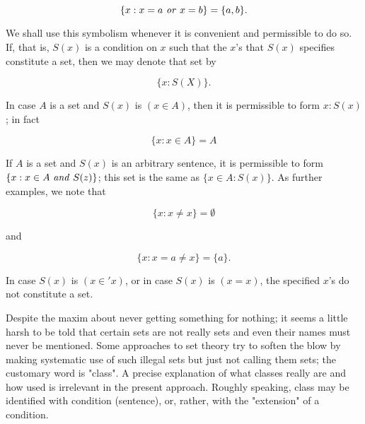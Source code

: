 \begin{equation*}
\{ x : x = a \text{ \textit{or} } x = b \} = \{ a,b \}.
\end{equation*}

We shall use this symbolism whenever it is convenient and permissible to do so. If, that is, $S(x)$ is a condition on $x$ such that the $x$'s that $S(x)$ specifies constitute a set, then we may denote that set by 

\begin{equation*}
\{ x : S(X) \}.
\end{equation*}

In case $A$ is a set and $S(x)$ is $(x \in A)$, then it is permissible to form ${x: S(x)}$; in fact 

\begin{equation*}
\{ x : x \in A \} = A
\end{equation*}

If $A$ is a set and $S(x)$ is an arbitrary sentence, it is permissible to form $ \{ x : x \in A \text{ \textit{and} } S(z) \}$; this set is the same as $\{x \in A: S(x) \}$. As further examples, we note that 

\begin{equation*}
\{ x : x \neq x \} = \emptyset
\end{equation*}

and

\begin{equation*}
\{ x : x = a\neq x \} = \{ a \}.
\end{equation*}

In case $S(x)$ is $(x \in ' x)$, or in case $S(x)$ is $(x = x)$, the specified $x$'s do not constitute a set. 

Despite the maxim about never getting something for nothing; it seems a little harsh to be told that certain sets are not really sets and even their names must never be mentioned. Some approaches to set theory try to soften the blow by making systematic use of such illegal sets but just not calling them sets; the customary word is "class". A precise explanation of what classes really are and how used is irrelevant in the present approach. Roughly speaking, class may be identified with condition (sentence), or, rather, with the "extension" of a condition.